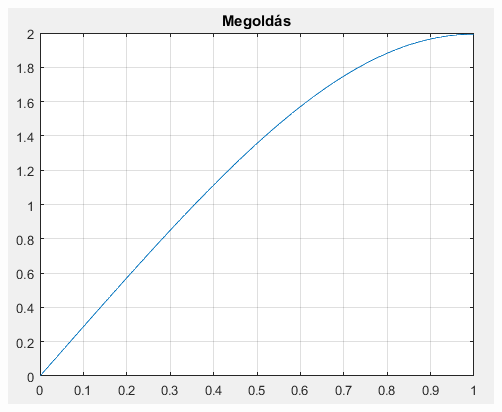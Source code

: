 \documentclass[oneside, titlepage, 12pt, a4paper]{report}
\begin{document}
\begin{center}
	\includegraphics{./abrak/pelda_02.png}
\end{center}



 

 
\end{document}
